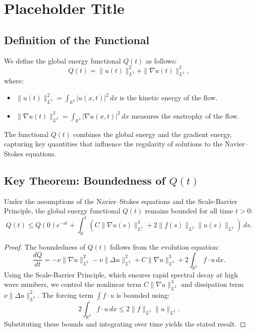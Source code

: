 \section{Placeholder Title}

\subsection{Definition of the Functional}
We define the global energy functional $Q(t)$ as follows:
\[
Q(t) = \|u(t)\|_{L^2}^2 + \|\nabla u(t)\|_{L^2}^2,
\]
where:
\begin{itemize}
    \item $\|u(t)\|_{L^2}^2 = \int_{\mathbb{R}^3} |u(x,t)|^2 \, dx$ is the kinetic energy of the flow.
    \item $\|\nabla u(t)\|_{L^2}^2 = \int_{\mathbb{R}^3} |\nabla u(x,t)|^2 \, dx$ measures the enstrophy of the flow.
\end{itemize}

The functional $Q(t)$ combines the global energy and the gradient energy, capturing key quantities that influence the regularity of solutions to the Navier--Stokes equations.

\subsection{Key Theorem: Boundedness of $Q(t)$}
\begin{theorem}
Under the assumptions of the Navier--Stokes equations and the Scale-Barrier Principle, the global energy functional $Q(t)$ remains bounded for all time $t > 0$:
\[
Q(t) \leq Q(0) e^{-\nu t} + \int_0^t \left( C \|\nabla u(s)\|_{L^2}^3 + 2 \|f(s)\|_{L^2}\|u(s)\|_{L^2} \right) \, ds.
\]
\end{theorem}

\begin{proof}
The boundedness of $Q(t)$ follows from the evolution equation:
\[
\frac{dQ}{dt} = -\nu \|\nabla u\|_{L^2}^2 - \nu \|\Delta u\|_{L^2}^2 + C \|\nabla u\|_{L^2}^3 + 2 \int_{\mathbb{R}^3} f \cdot u \, dx.
\]
Using the Scale-Barrier Principle, which ensures rapid spectral decay at high wave numbers, we control the nonlinear term $C \|\nabla u\|_{L^2}^3$ and dissipation term $\nu \|\Delta u\|_{L^2}^2$. The forcing term $\int f \cdot u$ is bounded using:
\[
2 \int_{\mathbb{R}^3} f \cdot u \, dx \leq 2 \|f\|_{L^2}\|u\|_{L^2}.
\]
Substituting these bounds and integrating over time yields the stated result.
\end{proof}

